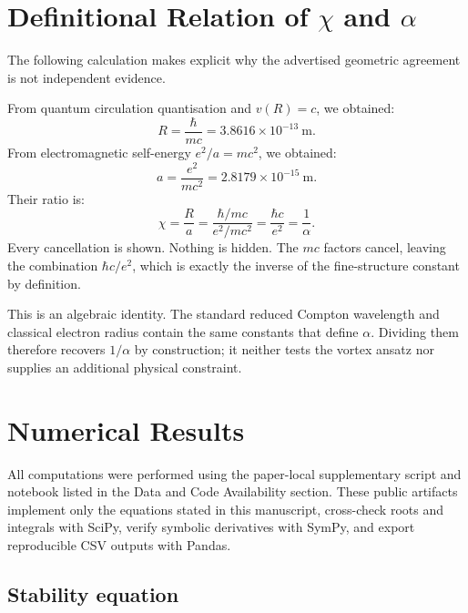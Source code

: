 \documentclass[11pt]{article}
\begin{document}
\section{Definitional Relation of $\chi$ and $\alpha$}

The following calculation makes explicit why the advertised geometric agreement
is not independent evidence.

From quantum circulation quantisation and $v(R) = c$, we obtained:
\begin{equation*}
  R = \frac{\hbar}{mc} = 3.8616 \times 10^{-13}\ \text{m.}
\end{equation*}
From electromagnetic self-energy $e^2/a = mc^2$, we obtained:
\begin{equation*}
  a = \frac{e^2}{mc^2} = 2.8179 \times 10^{-15}\ \text{m.}
\end{equation*}
Their ratio is:
\begin{equation}
  \chi = \frac{R}{a}
  = \frac{\hbar/mc}{e^2/mc^2}
  = \frac{\hbar c}{e^2}
  = \frac{1}{\alpha}.
  \label{eq:chi_is_alpha}
\end{equation}
Every cancellation is shown. Nothing is hidden. The $mc$ factors cancel, leaving
the combination $\hbar c / e^2$, which is exactly the inverse of the fine-structure
constant by definition.

This is an algebraic identity. The standard reduced Compton wavelength and
classical electron radius contain the same constants that define $\alpha$.
Dividing them therefore recovers $1/\alpha$ by construction; it neither tests
the vortex ansatz nor supplies an additional physical constraint.


\section{Numerical Results}
\label{sec:results}

All computations were performed using the paper-local supplementary script and
notebook listed in the Data and Code Availability section. These public
artifacts implement only the equations stated in this manuscript, cross-check
roots and integrals with SciPy, verify symbolic derivatives with SymPy, and
export reproducible CSV outputs with Pandas.

\subsection{Stability equation}
\end{document}
